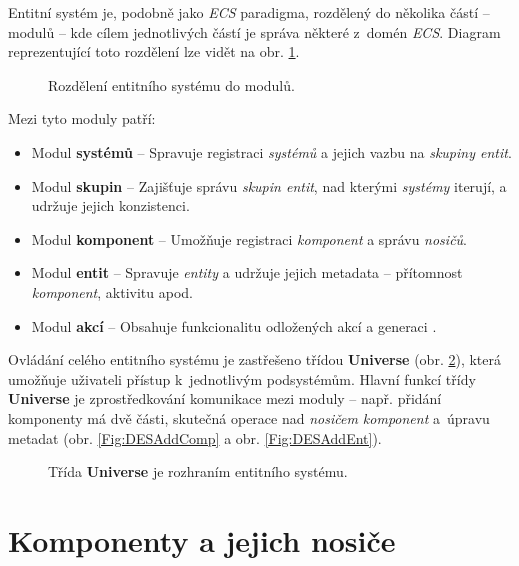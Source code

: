 Entitní systém je, podobně jako \emph{ECS} paradigma, rozdělený do několika částí -- modulů -- kde cílem jednotlivých částí je správa některé z~domén \emph{ECS}. Diagram reprezentující toto rozdělení lze vidět na obr. \ref{Fig:DESModules}.

\begin{figure}[H]
	\centering
	\caption{Rozdělení entitního systému do modulů.}
	\label{Fig:DESModules}
\end{figure}

\pagebreak

\noindent Mezi tyto moduly patří:

\begin{itemize}
	\item Modul \textbf{systémů} -- Spravuje registraci \emph{systémů} a jejich vazbu na \emph{skupiny entit}. 
	\item Modul \textbf{skupin} -- Zajišťuje správu \emph{skupin entit}, nad kterými \emph{systémy} iterují, a udržuje jejich konzistenci.
	\item Modul \textbf{komponent} -- Umožňuje registraci \emph{komponent} a správu \emph{nosičů}.
	\item Modul \textbf{entit} -- Spravuje \emph{entity} a udržuje jejich metadata -- přítomnost \emph{komponent}, aktivitu apod.
	\item Modul \textbf{akcí} -- Obsahuje funkcionalitu odložených akcí a generaci .
\end{itemize}

Ovládání celého entitního systému je zastřešeno třídou \textbf{Universe} (obr. \ref{Fig:DESUniverse}), která umožňuje uživateli přístup k~jednotlivým podsystémům. Hlavní funkcí třídy \textbf{Universe} je zprostředkování komunikace mezi moduly -- např. přidání komponenty má dvě části, skutečná operace nad \emph{nosičem komponent} a~úpravu metadat (obr. \ref{Fig:DESAddComp} a obr. \ref{Fig:DESAddEnt}). 

\begin{figure}[H]
	\centering
	\caption{Třída \textbf{Universe} je rozhraním entitního systému.}
	\label{Fig:DESUniverse}
\end{figure}

\section{Komponenty a jejich nosiče}

